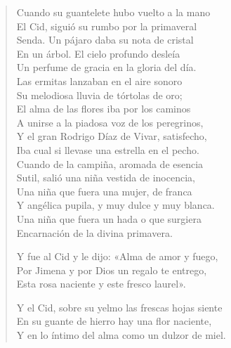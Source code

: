 \documentclass[12pt]{article}
\begin{document}
\begin{verse}
Cuando su guantelete hubo vuelto a la mano\\
El Cid, siguió su rumbo por la primaveral\\
Senda. Un pájaro daba su nota de cristal\\
En un árbol. El cielo profundo desleía\\
Un perfume de gracia en la gloria del día.\\
Las ermitas lanzaban en el aire sonoro\\
Su melodiosa lluvia de tórtolas de oro;\\
El alma de las flores iba por los caminos\\
A unirse a la piadosa voz de los peregrinos,\\
Y el gran Rodrigo Díaz de Vivar, satisfecho,\\
Iba cual si llevase una estrella en el pecho.\\
Cuando de la campiña, aromada de esencia\\
Sutil, salió una niña vestida de inocencia,\\
Una niña que fuera una mujer, de franca\\
Y angélica pupila, y muy dulce y muy blanca.\\
Una niña que fuera un hada o que surgiera\\
Encarnación de la divina primavera.  

Y fue al Cid y le dijo: «Alma de amor y fuego,\\
Por Jimena y por Dios un regalo te entrego,\\
Esta rosa naciente y este fresco laurel».  

Y el Cid, sobre su yelmo las frescas hojas siente\\
En su guante de hierro hay una flor naciente,\\
Y en lo íntimo del alma como un dulzor de miel.  

\end{verse}
\end{document}
